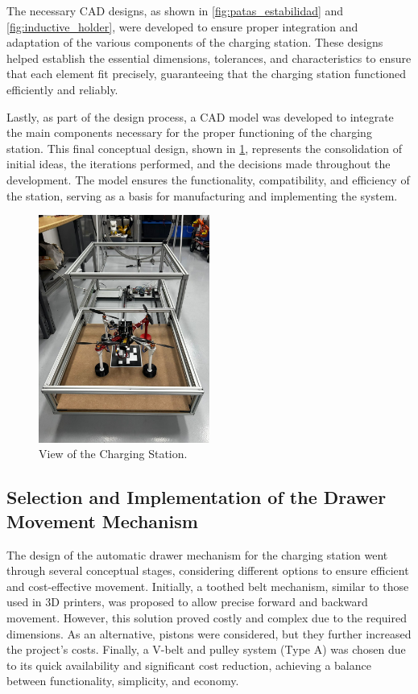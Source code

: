 The necessary CAD designs, as shown in \ref{fig:patas_estabilidad} and \ref{fig:inductive_holder}, were developed to ensure proper integration and adaptation of the various components of the charging station. These designs helped establish the essential dimensions, tolerances, and characteristics to ensure that each element fit precisely, guaranteeing that the charging station functioned efficiently and reliably.


Lastly, as part of the design process, a CAD model was developed to integrate the main components necessary for the proper functioning of the charging station. This final conceptual design, shown in \ref{fig:final_estacion}, represents the consolidation of initial ideas, the iterations performed, and the decisions made throughout the development. The model ensures the functionality, compatibility, and efficiency of the station, serving as a basis for manufacturing and implementing the system.

        \begin{figure}[H]
            \centering
            \includegraphics[width=0.5\textwidth]{pictures/ESTACION_FINAL.jpg}
            \caption{View of the Charging Station.}
            \label{fig:final_estacion}
        \end{figure}

\subsection{Selection and Implementation of the Drawer Movement Mechanism}

The design of the automatic drawer mechanism for the charging station went through several conceptual stages, considering different options to ensure efficient and cost-effective movement. Initially, a toothed belt mechanism, similar to those used in 3D printers, was proposed to allow precise forward and backward movement. However, this solution proved costly and complex due to the required dimensions. As an alternative, pistons were considered, but they further increased the project's costs. Finally, a V-belt and pulley system (Type A) was chosen due to its quick availability and significant cost reduction, achieving a balance between functionality, simplicity, and economy.

